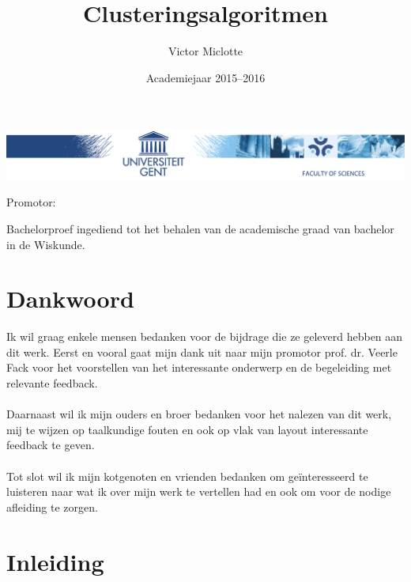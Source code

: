 \documentclass[a4paper,12pt]{article}
\title{Clusteringsalgoritmen}
\author{Victor Miclotte}
\date{Academiejaar 2015--2016}
\makeatletter
\theoremstyle{definition}
\renewcommand*{\maketitle}{
	\thispagestyle{empty}
	\begin{center}
	\includegraphics[width=\textwidth]{logobalk_ugent.pdf}

	\vspace{1cm}
	\huge \@faculteit

	\LARGE \@vakgroep

	\vfill{\Huge\textbf\@title}

	\vspace{1.5cm}{\Huge\textbf\@author}

	\vspace{3cm}\LARGE Promotor: \@promotor\vfill

	\Large Bachelorproef ingediend tot het behalen van de academische graad van bachelor in de Wiskunde.

	\vspace{1.5cm}\@date
	\end{center}
\clearpage}
\makeatother
\begin{document}
\maketitle
\newpage
{}
\section*{Dankwoord}
Ik wil graag enkele mensen bedanken voor de bijdrage die ze geleverd hebben aan
dit werk. Eerst en vooral gaat mijn dank uit naar mijn promotor prof. dr. Veerle
Fack voor het voorstellen van het interessante onderwerp en de begeleiding met
relevante feedback.\\
\ \\
Daarnaast wil ik mijn ouders en broer bedanken voor het 
nalezen van dit werk, mij te wijzen op taalkundige fouten en ook op vlak van
layout interessante feedback te geven.\\
\ \\
Tot slot wil ik mijn kotgenoten en vrienden
bedanken om geïnteresseerd te luisteren naar wat ik over mijn werk te vertellen had
en ook om voor de nodige afleiding te zorgen.

\newpage
\tableofcontents
\newpage
\setcounter{section}{0}
\section{Inleiding}
\end{document}
